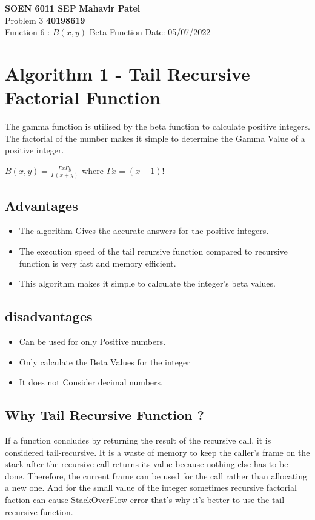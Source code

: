 \documentclass[a4paper, 12pt]{article}
\begin{document}
\noindent
\large\textbf{SOEN 6011 SEP} \hfill \textbf{Mahavir Patel} \\
\normalsize Problem 3 \hfill \textbf{40198619} \\
Function 6 :  $B(x,y)$ Beta Function \hfill Date: 05/07/2022 \\

\section{Algorithm 1 - Tail Recursive Factorial Function}
The gamma function is utilised by the beta function to calculate positive integers. The factorial of the number makes it simple to determine the Gamma Value of a positive integer. \\
\begin{center}
    $B(x,y)=\frac{\Gamma x \Gamma y}{\Gamma (x+y)}$ where $\Gamma x = (x-1)!$\\
\end{center}

\subsection{Advantages}
\begin{itemize}
    \item The algorithm Gives the accurate answers for the positive integers.
    \item The execution speed of the tail recursive function compared to recursive function is very fast and memory efficient. 
    \item This algorithm makes it simple to calculate the integer's beta values.
\end{itemize}
\subsection{disadvantages}
\begin{itemize}
    \item Can be used for only Positive numbers.
    \item Only calculate the Beta Values for the integer
    \item It does not Consider decimal numbers.
\end{itemize}

\subsection{Why Tail Recursive Function ?}
If a function concludes by returning the result of the recursive call, it is considered tail-recursive. It is a waste of memory to keep the caller's frame on the stack after the recursive call returns its value because nothing else has to be done. Therefore, the current frame can be used for the call rather than allocating a new one. And for the small value of the integer sometimes recursive factorial faction can cause StackOverFlow error that's why it's better to use the tail recursive function. \\
\end{document}
